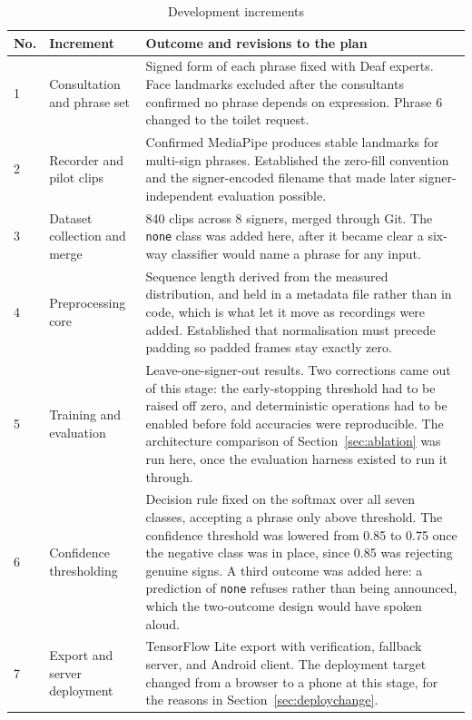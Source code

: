\begin{table}[htbp]
    \centering
    \caption{Development increments}
    \label{tab:sprints}
    \footnotesize
    \begin{tabular}{|p{0.9cm}|p{4.2cm}|p{8.1cm}|}
        \hline
        \textbf{No.} & \textbf{Increment} & \textbf{Outcome and revisions to the plan} \\
        \hline
        1 & Consultation and phrase set & Signed form of each phrase fixed with Deaf experts. Face landmarks excluded after the consultants confirmed no phrase depends on expression. Phrase 6 changed to the toilet request. \\
        \hline
        2 & Recorder and pilot clips & Confirmed MediaPipe produces stable landmarks for multi-sign phrases. Established the zero-fill convention and the signer-encoded filename that made later signer-independent evaluation possible. \\
        \hline
        3 & Dataset collection and merge & 840 clips across 8 signers, merged through Git. The \texttt{none} class was added here, after it became clear a six-way classifier would name a phrase for any input. \\
        \hline
        4 & Preprocessing core & Sequence length derived from the measured distribution, and held in a metadata file rather than in code, which is what let it move as recordings were added. Established that normalisation must precede padding so padded frames stay exactly zero. \\
        \hline
        5 & Training and evaluation & Leave-one-signer-out results. Two corrections came out of this stage: the early-stopping threshold had to be raised off zero, and deterministic operations had to be enabled before fold accuracies were reproducible. The architecture comparison of Section~\ref{sec:ablation} was run here, once the evaluation harness existed to run it through. \\
        \hline
        6 & Confidence thresholding & Decision rule fixed on the softmax over all seven classes, accepting a phrase only above threshold. The confidence threshold was lowered from 0.85 to 0.75 once the negative class was in place, since 0.85 was rejecting genuine signs. A third outcome was added here: a prediction of \texttt{none} refuses rather than being announced, which the two-outcome design would have spoken aloud. \\
        \hline
        7 & Export and server deployment & TensorFlow Lite export with verification, fallback server, and Android client. The deployment target changed from a browser to a phone at this stage, for the reasons in Section~\ref{sec:deploychange}. \\

\end{tabular}
\end{table}
